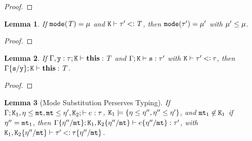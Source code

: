 \documentclass[onecolumn,nocopyrightspace]{sigplanconf}
\newtheorem{lemma}{Lemma}
\theoremstyle{lessintrusive}
\theoremstyle{plain}
\theoremstyle{custom}
\theoremstyle{subcase-custom}
\begin{document}
\begin{proof}
\end{proof} 

\begin{lemma}
\label{pf:fmode-subtypes}
If $\mathtt{mode}(\mathit{T}) = \mu$ and $\mathtt{K}\vdash\tau'\mathbin{<\vcentcolon}\mathit{T}$, then $\mathtt{mode}(\tau') = \mu'$ with $\mu'\leq\mu$.
\end{lemma}

\begin{proof}
\end{proof} 

\begin{lemma}
\label{pf:this-fixed}
If $\Gamma,\mathtt{y}:\tau;\mathtt{K} \vdash \texttt{\bf this}:\mathit{T}$ and $\Gamma;\mathtt{K} \vdash \mathtt{s}:\tau'$ with $\mathtt{K} \vdash \tau' \mathbin{<\vcentcolon} \tau$, then $\Gamma\{\mathtt{s}/\mathtt{y}\};\mathtt{K} \vdash \texttt{\bf this}:\mathit{T}$.
\end{lemma}

\begin{proof}
\end{proof}

\begin{lemma}[Mode Substitution Perserves Typing]
\label{pf:modesubstitution-preserves-typing}
If $\Gamma;\mathtt{K}_{1},\eta\leq\mathtt{mt},\mathtt{mt}\leq\eta',\mathtt{K}_{2};\vdash e:\tau$, $\mathtt{K}_{1}\models\{\eta\leq\eta'',\eta''\leq\eta'\}$, and $\mathtt{mt}_{1} \not\in \mathtt{K}_{1}$ if $\eta'' = \mathtt{mt}_{1}$, then $\Gamma\{\eta''/\mathtt{mt}\};\mathtt{K}_{1},\mathtt{K}_{2}\{\eta''/\mathtt{mt}\}\vdash e\{\eta''/\mathtt{mt}\}:\tau'$, with $\mathtt{K}_{1},\mathtt{K}_{2}\{\eta''/\mathtt{mt}\}\vdash\tau'\mathbin{<\vcentcolon}\tau\{\eta''/\mathtt{mt}\}$.
\end{lemma}
\end{document}

